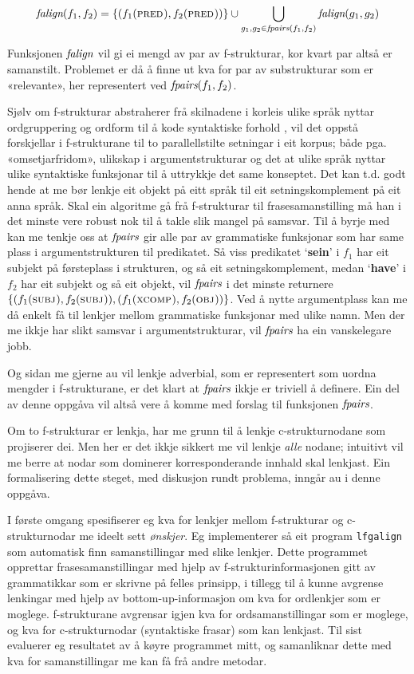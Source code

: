 \documentclass[12pt,a4paper,oneside,draft]{report}
\newcommand{\F}[2]{\textsc{#1}\ensuremath{_{#2}}}
\newcommand{\OBJ}{\F{obj}{}}
\newcommand{\XCOMP}{\F{xcomp}{}}
\newcommand{\SUBJ}{\F{subj}{}}
\newcommand{\PRED}{\F{pred}{}}
\newcommand{\falign}{\ensuremath{\operatorname{\emph{falign}}}}
\newcommand{\fpairs}{\ensuremath{\operatorname{\emph{fpairs}}}}
\newcommand{\p}[1]{`\textbf{#1}'}
\begin{document}
\[
\falign(f_{1}, f_{2}) =
\{ (f_{1}(\PRED), f_{2}(\PRED)) \}
\cup
\bigcup_{g_{1},g_{2}\in \fpairs(f_{1},f_{2})} \falign(g_{1}, g_{2})
\]

Funksjonen \falign{} vil gi ei mengd av par av f\hyp{}strukturar, kor kvart
 par altså er samanstilt. Problemet er då å finne ut kva for par av
 substrukturar som er «relevante», her representert ved
 $\fpairs(f_{1},f_{2})$.


Sjølv om f\hyp{}strukturar abstraherer frå skilnadene i korleis ulike språk
 nyttar ordgruppering og ordform til å kode syntaktiske forhold
 \citep[s.~14]{bresnan2001lfs}, vil det oppstå forskjellar i
 f\hyp{}strukturane til to parallellstilte setningar i eit korpus; både
 pga. «omsetjarfridom», ulikskap i argumentstrukturar og det at ulike
 språk nyttar ulike syntaktiske funksjonar til å uttrykkje det same
 konseptet. Det kan t.d. godt hende at me bør lenkje eit objekt på
 eitt språk til eit setningskomplement på eit anna språk. Skal ein
 algoritme gå frå f\hyp{}strukturar til frasesamanstilling må han i det
 minste vere robust nok til å takle slik mangel på samsvar. Til å
 byrje med kan me tenkje oss at \fpairs{} gir alle par av grammatiske
 funksjonar som har same plass i argumentstrukturen til predikatet. Så
 viss predikatet \p{sein} i $f_1$ har eit subjekt på førsteplass i
 strukturen, og så eit setningskomplement, medan \p{have} i $f_2$ har
 eit subjekt og så eit objekt, vil \fpairs{} i det minste returnere
 $\{(f_{1}(\SUBJ),f_{2}(\SUBJ)),(f_{1}(\XCOMP),f_{2}(\OBJ))\}$.  Ved å
 nytte argumentplass kan me då enkelt få til lenkjer mellom
 grammatiske funksjonar med ulike namn.  Men der me ikkje har slikt
 samsvar i argumentstrukturar, vil \fpairs{} ha ein vanskelegare jobb.

Og sidan me gjerne au vil lenkje adverbial, som er representert som
 uordna mengder i f\hyp{}strukturane, er det klart at \fpairs{} ikkje er
 triviell å definere. Ein del av denne oppgåva vil altså vere å komme
 med forslag til funksjonen \fpairs{}.

Om to f\hyp{}strukturar er lenkja, har me grunn til å lenkje
 c\hyp{}strukturnodane som projiserer dei. Men her er det ikkje sikkert me
 vil lenkje \emph{alle} nodane; intuitivt vil me berre at nodar som
 dominerer korresponderande innhald skal lenkjast.  Ein formalisering
 dette steget, med diskusjon rundt problema, inngår au i denne
 oppgåva.

I første omgang spesifiserer eg kva for lenkjer mellom
 f\hyp{}strukturar og c\hyp{}strukturnodar me ideelt sett
 \emph{ønskjer}. Eg implementerer så eit program \texttt{lfgalign} som automatisk
 finn samanstillingar med slike lenkjer.  Dette programmet opprettar
 frasesamanstillingar med hjelp av f\hyp{}strukturinformasjonen gitt
 av grammatikkar som er skrivne på felles prinsipp, i tillegg til å
 kunne avgrense lenkingar med hjelp av bottom-up-informasjon om kva
 for ordlenkjer som er moglege. f\hyp{}strukturane avgrensar igjen kva
 for ordsamanstillingar som er moglege, og kva for
 c\hyp{}strukturnodar (syntaktiske frasar) som kan lenkjast. Til sist
 evaluerer eg resultatet av å køyre programmet mitt, og samanliknar
 dette med kva for samanstillingar me kan få frå andre metodar.
\end{document}
